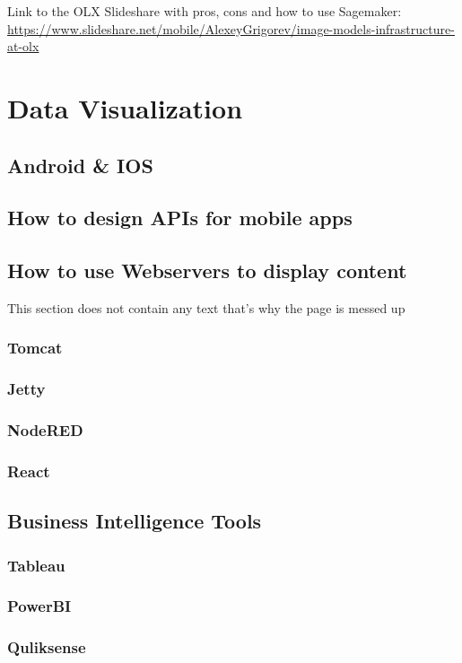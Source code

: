 \documentclass[12pt, numbers=noenddot]{scrreprt} %
\begin{document}
Link to the OLX Slideshare with pros, cons and how to use Sagemaker:
\url{https://www.slideshare.net/mobile/AlexeyGrigorev/image-models-infrastructure-at-olx}


\chapter{Data Visualization}

\section{Android \& IOS }
\section{How to design APIs for mobile apps}

\section{How to use Webservers to display content}
This section does not contain any text that's why the page is messed up
\subsection{Tomcat}
\subsection{Jetty}
\subsection{NodeRED}
\subsection{React}

\section{Business Intelligence Tools}
\subsection{Tableau}
\subsection{PowerBI}
\subsection{Quliksense}
\end{document}
